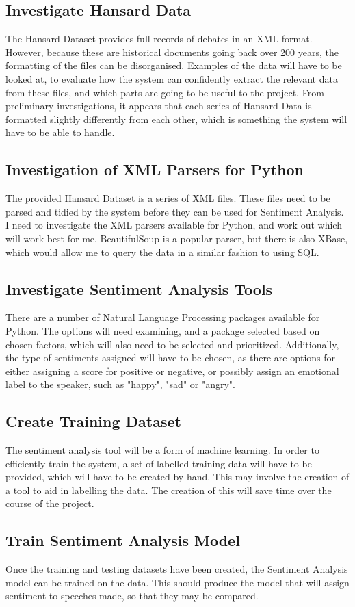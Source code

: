 \documentclass[11pt,fleqn,twoside]{article}
\begin{document}
\subsection{Investigate Hansard Data}
The Hansard Dataset provides full records of debates in an XML format. However, because these are historical documents going back over 200 years, the formatting of the files can be disorganised. Examples of the data will have to be looked at, to evaluate how the system can confidently extract the relevant data from these files, and which parts are going to be useful to the project. From preliminary investigations, it appears that each series of Hansard Data is formatted slightly differently from each other, which is something the system will have to be able to handle.
\subsection{Investigation of XML Parsers for Python}
The provided Hansard Dataset is a series of XML files. These files need to be parsed and tidied by the system before they can be used for Sentiment Analysis. I need to investigate the XML parsers available for Python, and work out which will work best for me. BeautifulSoup is a popular parser, but there is also XBase, which would allow me to query the data in a similar fashion to using SQL.
\subsection{Investigate Sentiment Analysis Tools}
There are a number of Natural Language Processing packages available for Python. The options will need examining, and a package selected based on chosen factors, which will also need to be selected and prioritized. Additionally, the type of sentiments assigned will have to be chosen, as there are options for either assigning a score for positive or negative, or possibly assign an emotional label to the speaker, such as "happy", "sad" or "angry".
\subsection{Create Training Dataset}
The sentiment analysis tool will be a form of machine learning. In order to efficiently train the system, a set of labelled training data will have to be provided, which will have to be created by hand. This may involve the creation of a tool to aid in labelling the data. The creation of this will save time over the course of the project.
\subsection{Train Sentiment Analysis Model}
Once the training and testing datasets have been created, the Sentiment Analysis model can be trained on the data. This should produce the model that will assign sentiment to speeches made, so that they may be compared.
\end{document}
